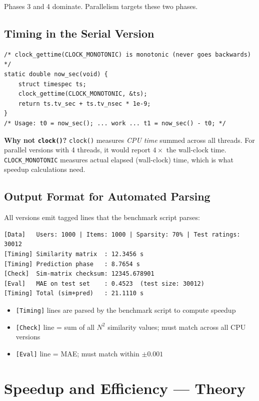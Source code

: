 \documentclass[12pt,a4paper]{article}
\begin{document}
Phases 3 and 4 dominate.  Parallelism targets these two phases.

\subsection{Timing in the Serial Version}

\begin{lstlisting}
/* clock_gettime(CLOCK_MONOTONIC) is monotonic (never goes backwards) */
static double now_sec(void) {
    struct timespec ts;
    clock_gettime(CLOCK_MONOTONIC, &ts);
    return ts.tv_sec + ts.tv_nsec * 1e-9;
}
/* Usage: t0 = now_sec(); ... work ... t1 = now_sec() - t0; */
\end{lstlisting}

\textbf{Why not \texttt{clock()}?}  \texttt{clock()} measures \emph{CPU time}
summed across all threads.  For parallel versions with 4 threads, it would
report $4\times$ the wall-clock time.  \texttt{CLOCK\_MONOTONIC} measures
actual elapsed (wall-clock) time, which is what speedup calculations need.

\subsection{Output Format for Automated Parsing}

All versions emit tagged lines that the benchmark script parses:
\begin{verbatim}
[Data]   Users: 1000 | Items: 1000 | Sparsity: 70% | Test ratings: 30012
[Timing] Similarity matrix  : 12.3456 s
[Timing] Prediction phase   : 8.7654 s
[Check]  Sim-matrix checksum: 12345.678901
[Eval]   MAE on test set    : 0.4523  (test size: 30012)
[Timing] Total (sim+pred)   : 21.1110 s
\end{verbatim}

\begin{itemize}
    \item \texttt{[Timing]} lines are parsed by the benchmark script to compute speedup
    \item \texttt{[Check]} line = sum of all $N^2$ similarity values;
          must match across all CPU versions
    \item \texttt{[Eval]} line = MAE; must match within $\pm 0.001$
\end{itemize}

\section{Speedup and Efficiency — Theory}
\end{document}
